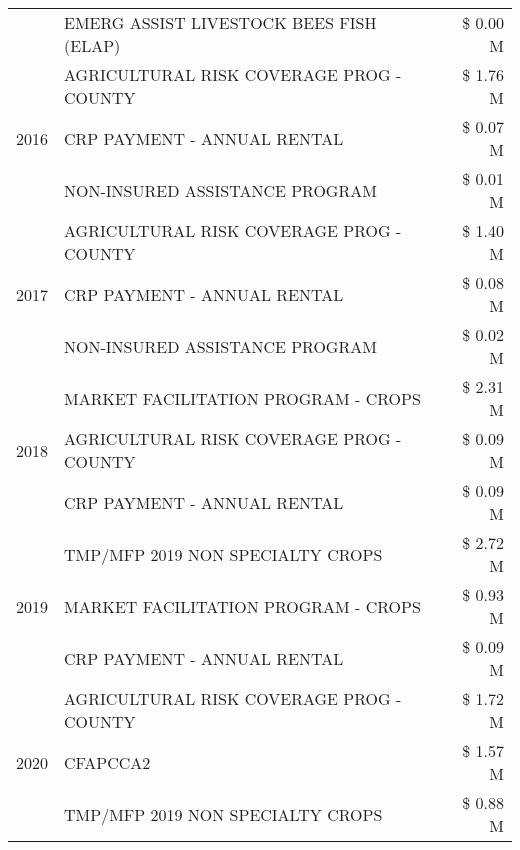 \begin{tabular}{llr}
 & EMERG ASSIST LIVESTOCK BEES FISH (ELAP) & \$ 0.00 M \\
\cline{1-3}
\multirow[t]{3}{*}{2016} & AGRICULTURAL RISK COVERAGE PROG - COUNTY      & \$ 1.76 M \\
 & CRP PAYMENT - ANNUAL RENTAL                   & \$ 0.07 M \\
 & NON-INSURED ASSISTANCE PROGRAM                & \$ 0.01 M \\
\cline{1-3}
\multirow[t]{3}{*}{2017} & AGRICULTURAL RISK COVERAGE PROG - COUNTY & \$ 1.40 M \\
 & CRP PAYMENT - ANNUAL RENTAL & \$ 0.08 M \\
 & NON-INSURED ASSISTANCE PROGRAM & \$ 0.02 M \\
\cline{1-3}
\multirow[t]{3}{*}{2018} & MARKET FACILITATION PROGRAM - CROPS & \$ 2.31 M \\
 & AGRICULTURAL RISK COVERAGE PROG - COUNTY & \$ 0.09 M \\
 & CRP PAYMENT - ANNUAL RENTAL & \$ 0.09 M \\
\cline{1-3}
\multirow[t]{3}{*}{2019} & TMP/MFP 2019 NON SPECIALTY CROPS & \$ 2.72 M \\
 & MARKET FACILITATION PROGRAM - CROPS & \$ 0.93 M \\
 & CRP PAYMENT - ANNUAL RENTAL & \$ 0.09 M \\
\cline{1-3}
\multirow[t]{3}{*}{2020} & AGRICULTURAL RISK COVERAGE PROG - COUNTY & \$ 1.72 M \\
 & CFAPCCA2 & \$ 1.57 M \\
 & TMP/MFP 2019 NON SPECIALTY CROPS & \$ 0.88 M \\
\cline{1-3}
\bottomrule
\end{tabular}

